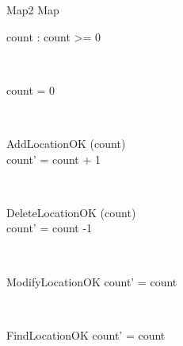 \documentclass[12pt]{article}
\begin{document}
\begin{spacing}{1.5}
\begin{class}{Map2}
\also
Map \\
\begin{state}
count : 
\where
count >= 0
\end{state} \\
\begin{init}
count = 0
\end{init} \\
\begin{op}{AddLocationOK}
\Delta (count) \\
\ST
count' = count + 1
\end{op}\\
\begin{op}{DeleteLocationOK}
\Delta (count) \\
\ST
count' = count -1
\end{op}\\
\begin{op}{ModifyLocationOK}
\ST
count' = count
\end{op}\\ 
\begin{op}{FindLocationOK}
\ST
count' = count
\end{op}\\
\end{class}




\end{spacing}
\end{document}
